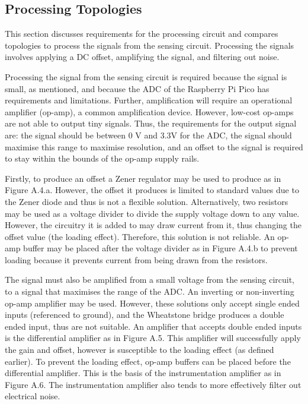 \subsection{Processing Topologies}
This section discusses requirements for the processing circuit and compares topologies to process the signals from the sensing circuit. Processing the signals involves applying a DC offset, amplifying the signal, and filtering out noise.

Processing the signal from the sensing circuit is required because the signal is small, as mentioned, and because the ADC of the Raspberry Pi Pico has requirements and limitations. Further, amplification will require an operational amplifier (op-amp), a common amplification device. However, low-cost op-amps are not able to output tiny signals. Thus, the requirements for the output signal are: the signal should be between 0 V and 3.3V for the ADC, the signal should maximise this range to maximise resolution, and an offset to the signal is required to stay within the bounds of the op-amp supply rails.

Firstly, to produce an offset a Zener regulator may be used to produce as in Figure A.4.a. However, the offset it produces is limited to standard values due to the Zener diode and thus is not a flexible solution. Alternatively, two resistors may be used as a voltage divider to divide the supply voltage down to any value. However, the circuitry it is added to may draw current from it, thus changing the offset value (the loading effect). Therefore, this solution is not reliable. An op-amp buffer may be placed after the voltage divider as in Figure A.4.b to prevent loading because it prevents current from being drawn from the resistors.

The signal must also be amplified from a small voltage from the sensing circuit, to a signal that maximises the range of the ADC. An inverting or non-inverting op-amp amplifier may be used. However, these solutions only accept single ended inputs (referenced to ground), and the Wheatstone bridge produces a double ended input, thus are not suitable. An amplifier that accepts double ended inputs is the differential amplifier as in Figure A.5. This amplifier will successfully apply the gain and offset, however is susceptible to the loading effect (as defined earlier). To prevent the loading effect, op-amp buffers can be placed before the differential amplifier. This is the basis of the instrumentation amplifier as in Figure A.6. The instrumentation amplifier also tends to more effectively filter out electrical noise.

